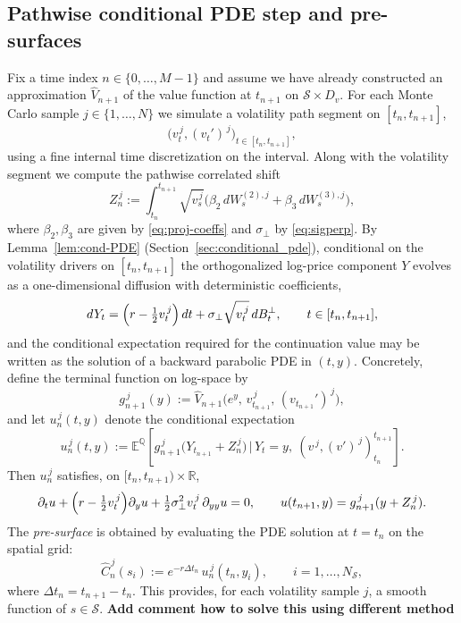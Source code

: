 \documentclass[10pt]{article}
\theoremstyle{plain}
\theoremstyle{definition}
\theoremstyle{remark}
\begin{document}
\subsection{Pathwise conditional PDE step and pre-surfaces}
Fix a time index $n\in\{0,\dots,M-1\}$ and assume we have already constructed an approximation $\widehat V_{n+1}$ of the value function at
$t_{n+1}$ on $\mathcal S\times D_v$. For each Monte Carlo sample $j\in\{1,\dots,N\}$ we simulate a volatility path segment on $[t_n,t_{n+1}]$,
\[
\bigl(v_t^{\,j},(v_t')^{\,j}\bigr)_{t\in[t_n,t_{n+1}]},
\]
using a fine internal time discretization on the interval.
Along with the volatility segment we compute the pathwise correlated shift
\begin{equation}
Z_n^{\,j}
:=\int_{t_n}^{t_{n+1}} \sqrt{v_s^{\,j}}\bigl(\beta_2\,dW_s^{(2),j}+\beta_3\,dW_s^{(3),j}\bigr),
\label{eq:Zn}
\end{equation}
where $\beta_2,\beta_3$ are given by \eqref{eq:proj-coeffs} and $\sigma_\perp$ by \eqref{eq:sigperp}.
By Lemma~\ref{lem:cond-PDE} (Section~\ref{sec:conditional_pde}), conditional on the volatility drivers on $[t_n,t_{n+1}]$ the orthogonalized
log-price component $Y$ evolves as a one-dimensional diffusion with deterministic coefficients,
\[
dY_t = \Bigl(r-\tfrac12 v_t^{\,j}\Bigr)\,dt + \sigma_\perp\sqrt{v_t^{\,j}}\,dB_t^\perp,\qquad t\in[t_n,t_{n+1}],
\]
and the conditional expectation required for the continuation value may be written as the solution of a backward parabolic PDE in $(t,y)$.
Concretely, define the terminal function on log-space by
\[
g_{n+1}^{\,j}(y) := \widehat V_{n+1}\bigl(e^{y},\,v_{t_{n+1}}^{\,j},\,(v_{t_{n+1}}')^{\,j}\bigr),
\]
and let $u_n^{\,j}(t,y)$ denote the conditional expectation
\[
u_n^{\,j}(t,y)
:= \mathbb E^{\mathbb Q}\!\left[g_{n+1}^{\,j}\bigl(Y_{t_{n+1}} + Z_n^{\,j}\bigr)\,\big|\,Y_t=y,\ (v^{\,j},(v')^{\,j})_{t_n}^{t_{n+1}}\right].
\]
Then $u_n^{\,j}$ satisfies, on $[t_n,t_{n+1})\times\mathbb R$,
\begin{equation}
\partial_t u + \Bigl(r-\tfrac12 v_t^{\,j}\Bigr)\partial_y u + \tfrac12 \sigma_\perp^2 v_t^{\,j}\,\partial_{yy}u = 0,
\qquad
u(t_{n+1},y) = g_{n+1}^{\,j}(y+Z_n^{\,j}).
\label{eq:pathwise-pde}
\end{equation}
The \emph{pre-surface} is obtained by evaluating the PDE solution at $t=t_n$ on the spatial grid:
\begin{equation}
\widehat C_n^{\,j}(s_i)
:= e^{-r\Delta t_n}\,u_n^{\,j}(t_n,y_i),
\qquad i=1,\dots,N_{\mathcal S},
\label{eq:presurface}
\end{equation}
where $\Delta t_n=t_{n+1}-t_n$. This provides, for each volatility sample $j$, a smooth function of $s\in\mathcal S$.
\textbf{Add comment  how to solve this using different method}
\end{document}
